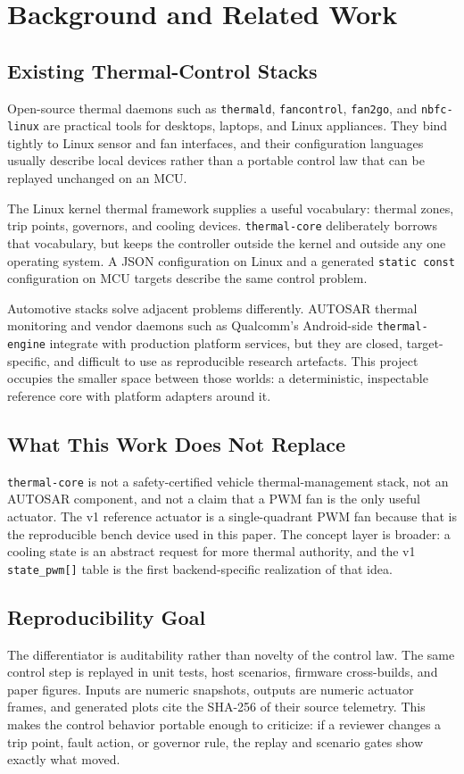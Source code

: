 \section{Background and Related Work}\label{sec:background}

\subsection{Existing Thermal-Control Stacks}

Open-source thermal daemons such as \texttt{thermald}, \texttt{fancontrol}, \texttt{fan2go}, and \texttt{nbfc-linux} are practical tools for desktops, laptops, and Linux appliances. They bind tightly to Linux sensor and fan interfaces, and their configuration languages usually describe local devices rather than a portable control law that can be replayed unchanged on an MCU.

The Linux kernel thermal framework supplies a useful vocabulary: thermal zones, trip points, governors, and cooling devices. \texttt{thermal-core} deliberately borrows that vocabulary, but keeps the controller outside the kernel and outside any one operating system. A JSON configuration on Linux and a generated \texttt{static const} configuration on MCU targets describe the same control problem.

Automotive stacks solve adjacent problems differently. AUTOSAR thermal monitoring and vendor daemons such as Qualcomm's Android-side \texttt{thermal-engine} integrate with production platform services, but they are closed, target-specific, and difficult to use as reproducible research artefacts. This project occupies the smaller space between those worlds: a deterministic, inspectable reference core with platform adapters around it.

\subsection{What This Work Does Not Replace}

\texttt{thermal-core} is not a safety-certified vehicle thermal-management stack, not an AUTOSAR component, and not a claim that a PWM fan is the only useful actuator. The v1 reference actuator is a single-quadrant PWM fan because that is the reproducible bench device used in this paper. The concept layer is broader: a cooling state is an abstract request for more thermal authority, and the v1 \texttt{state\_pwm[]} table is the first backend-specific realization of that idea.

\subsection{Reproducibility Goal}

The differentiator is auditability rather than novelty of the control law. The same control step is replayed in unit tests, host scenarios, firmware cross-builds, and paper figures. Inputs are numeric snapshots, outputs are numeric actuator frames, and generated plots cite the SHA-256 of their source telemetry. This makes the control behavior portable enough to criticize: if a reviewer changes a trip point, fault action, or governor rule, the replay and scenario gates show exactly what moved.

\endinput
